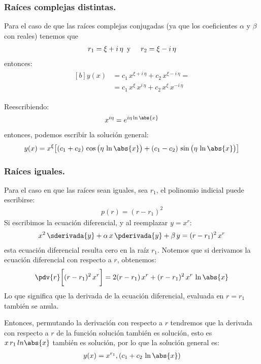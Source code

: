 \subsubsection{Raíces complejas distintas.}

Para el caso de que las raíces complejas conjugadas (ya que los coeficientes $\alpha$ y $\beta$ con reales) tenemos que
\begin{align*}
r_{1} = \xi + i \, \eta \hspace{0.5em} \mbox{y} \hspace{0.5cm} r_{2} = \xi - i \, \eta
\end{align*}
entonces:
\begin{align}
\begin{aligned}[b]
y (x) &= c_{1} \, x^{\xi + i \, \eta} + c_{2} \, x^{\xi - i \, \eta} = \\[0.5em]
&= c_{1} \, x^{\xi} \, x^{i \, \eta} + c_{2} \, x^{\xi} \, x^{- i \, \eta}
\end{aligned}
\label{eq:ecuacion_13}
\end{align}

Reescribiendo:
\begin{align*}
x^{i \eta} = e^{i \eta \ln \abs{x}}
\end{align*}
entonces, podemos escribir la solución general:
\begin{align}
y (x) = x^{\xi} \big[ (c_{1} + c_{2}) \, \cos \big( \eta \, \ln \abs{x} \big) + (c_{1} - c_{2}) \, \sin \big( \eta \, \ln \abs{x} \big) \big]
\label{eq:ecuacion_14}
\end{align}

\subsubsection{Raíces iguales.}

Para el caso en que las raíces sean iguales, sea $r_{1}$, el polinomio indicial puede escribirse:
\begin{align*}
p (r) = (r - r_{1})^{2}
\end{align*}
Si escribimos la ecuación diferencial, y al reemplazar $y = x^{r}$:
\begin{align*}
x^{2} \, \sderivada{y} + \alpha \, x \, \pderivada{y} + \beta \, y = (r - r_{1})^{2} \, x^{r}
\end{align*}
esta ecuación diferencial resulta cero en la raíz $r_{1}$. Notemos que si derivamos la ecuación diferencial con respecto a $r$, obtenemos:
\begin{align*}
\pdv{r} \bigg[ (r - r_{1})^{2} \, x^{r} \bigg] = 2 (r - r_{1}) \, x^{r} + (r - r_{1})^{2} \, x^{r} \, \ln \abs{x}
\end{align*}
Lo que significa que la derivada de la ecuación diferencial, evaluada en $r = r_{1}$ también se anula.
\par
Entonces, permutando la derivación con respecto a $r$ tendremos que la derivada con respecto a $r$ de la función solución también es solución, esto es $x \, r_{1} \, ln \abs{x}$ también es solución, por lo que la solución general es:
\begin{align}
y (x) = x^{r_{1}} , (c_{1} + c_{2} \, \ln \abs{x})
\label{eq:ecuacion_15}
\end{align}


